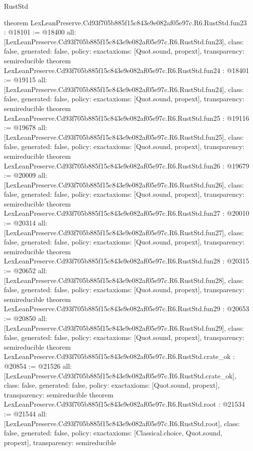 \begin{lexlean}{RustStd}
\begin{coremodule}
{}
theorem LexLeanPreserve.Cd93f705b885f15c843e9e082af05e97c.R6.RustStd.fun23 : @18101 := @18400 {
  all: [LexLeanPreserve.Cd93f705b885f15c843e9e082af05e97c.R6.RustStd.fun23],
  class: false,
  generated: false,
  policy: exact{axioms: [Quot.sound, propext]},
  transparency: semireducible
}
theorem LexLeanPreserve.Cd93f705b885f15c843e9e082af05e97c.R6.RustStd.fun24 : @18401 := @19115 {
  all: [LexLeanPreserve.Cd93f705b885f15c843e9e082af05e97c.R6.RustStd.fun24],
  class: false,
  generated: false,
  policy: exact{axioms: [Quot.sound, propext]},
  transparency: semireducible
}
theorem LexLeanPreserve.Cd93f705b885f15c843e9e082af05e97c.R6.RustStd.fun25 : @19116 := @19678 {
  all: [LexLeanPreserve.Cd93f705b885f15c843e9e082af05e97c.R6.RustStd.fun25],
  class: false,
  generated: false,
  policy: exact{axioms: [Quot.sound, propext]},
  transparency: semireducible
}
theorem LexLeanPreserve.Cd93f705b885f15c843e9e082af05e97c.R6.RustStd.fun26 : @19679 := @20009 {
  all: [LexLeanPreserve.Cd93f705b885f15c843e9e082af05e97c.R6.RustStd.fun26],
  class: false,
  generated: false,
  policy: exact{axioms: [Quot.sound, propext]},
  transparency: semireducible
}
theorem LexLeanPreserve.Cd93f705b885f15c843e9e082af05e97c.R6.RustStd.fun27 : @20010 := @20314 {
  all: [LexLeanPreserve.Cd93f705b885f15c843e9e082af05e97c.R6.RustStd.fun27],
  class: false,
  generated: false,
  policy: exact{axioms: [Quot.sound, propext]},
  transparency: semireducible
}
theorem LexLeanPreserve.Cd93f705b885f15c843e9e082af05e97c.R6.RustStd.fun28 : @20315 := @20652 {
  all: [LexLeanPreserve.Cd93f705b885f15c843e9e082af05e97c.R6.RustStd.fun28],
  class: false,
  generated: false,
  policy: exact{axioms: [Quot.sound, propext]},
  transparency: semireducible
}
theorem LexLeanPreserve.Cd93f705b885f15c843e9e082af05e97c.R6.RustStd.fun29 : @20653 := @20850 {
  all: [LexLeanPreserve.Cd93f705b885f15c843e9e082af05e97c.R6.RustStd.fun29],
  class: false,
  generated: false,
  policy: exact{axioms: [Quot.sound, propext]},
  transparency: semireducible
}
theorem LexLeanPreserve.Cd93f705b885f15c843e9e082af05e97c.R6.RustStd.crate_ok : @20854 := @21526 {
  all: [LexLeanPreserve.Cd93f705b885f15c843e9e082af05e97c.R6.RustStd.crate_ok],
  class: false,
  generated: false,
  policy: exact{axioms: [Quot.sound, propext]},
  transparency: semireducible
}
theorem LexLeanPreserve.Cd93f705b885f15c843e9e082af05e97c.R6.RustStd.root : @21534 := @21544 {
  all: [LexLeanPreserve.Cd93f705b885f15c843e9e082af05e97c.R6.RustStd.root],
  class: false,
  generated: false,
  policy: exact{axioms: [Classical.choice, Quot.sound, propext]},
  transparency: semireducible
}


\end{coremodule}
\end{lexlean}
